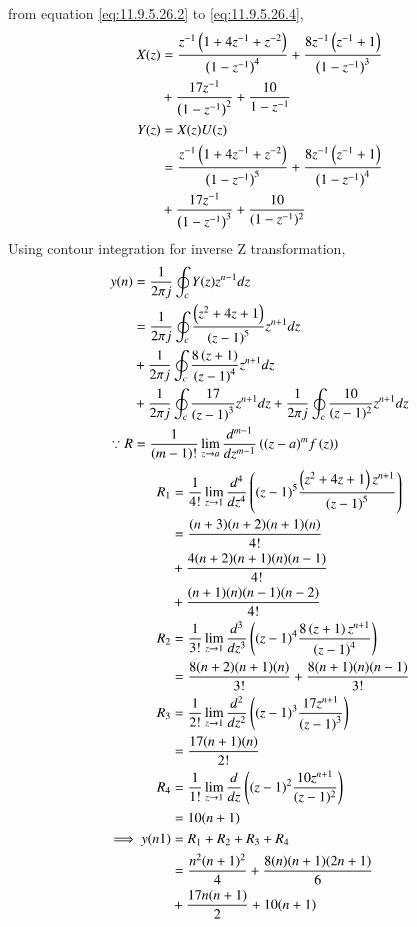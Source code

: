 \documentclass[journal,12pt,twocolumn]{IEEEtran}
\theoremstyle{remark}
\begin{document}
from equation \eqref{eq:11.9.5.26.2} to \eqref{eq:11.9.5.26.4},\\
    \begin{align}
        X(z) &= \frac{z^{-1}\left(1+4z^{-1}+z^{-2}\right)}{\left(1-z^{-1}\right)^4} + \frac{8z^{-1}\left(z^{-1}+1\right)}{\left(1-z^{-1}\right)^3} \nonumber\\
        &+ \frac{17z^{-1}}{\left(1-z^{-1}\right)^2}  + \frac{10}{1-z^{-1}}\\
        Y(z) &= X(z)U(z)\\
        &= \frac{z^{-1}\left(1+4z^{-1}+z^{-2}\right)}{\left(1-z^{-1}\right)^5} + \frac{8z^{-1}\left(z^{-1}+1\right)}{\left(1-z^{-1}\right)^4} \nonumber\\
        &+ \frac{17z^{-1}}{\left(1-z^{-1}\right)^3} +\frac{10}{(1-z^{-1})^2}
    \end{align}
Using contour integration for inverse Z transformation,
    \begin{align}
        y(n) &= \frac{1}{2\pi j}\oint_c Y(z) z^{n-1} dz \\
        &= \frac{1}{2\pi j}\oint_c \frac{\left(z^2+4z+1\right)}{\left(z-1\right)^5} z^{n+1} dz  \nonumber\\
        &+ \frac{1}{2\pi j}\oint_c \frac{8\left(z+1\right)}{\left(z-1\right)^4} z^{n+1} dz   \nonumber\\
        &+ \frac{1}{2\pi j}\oint_c \frac{17}{\left(z-1\right)^3} z^{n+1} dz + \frac{1}{2\pi j}\oint_c \frac{10}{(z-1)^2}z^{n+1} dz\\
        \because R&=\frac{1}{\left(m-1\right)!}\lim\limits_{z\to a}\frac{d^{m-1}}{dz^{m-1}}\left({(z-a)}^{m}f\left(z\right)\right)
    \end{align}
    \begin{align}
        R_1 &=\frac{1}{4!}\lim\limits_{z\to 1}\frac{d^4}{dz^4}\left((z-1)^5 \frac{\left(z^2+4z+1\right)z^{n+1}}{\left(z-1\right)^5}\right)\\
        &= \frac{(n+3)(n+2)(n+1)(n)}{4!} \nonumber\\
        & + \frac{4(n+2)(n+1)(n)(n-1)}{4!} \nonumber\\
        & + \frac{(n+1)(n)(n-1)(n-2)}{4!}\\
        R_2 &=\frac{1}{3!}\lim\limits_{z\to 1}\frac{d^3}{dz^3} \left((z-1)^4 \frac{8\left(z+1\right)z^{n+1}}{\left(z-1\right)^4}\right)\\
        &= \frac{8(n+2)(n+1)(n)}{3!} + \frac{8(n+1)(n)(n-1)}{3!}\\
        R_3 &=\frac{1}{2!}\lim\limits_{z\to 1}\frac{d^2}{dz^2} \left((z-1)^3 \frac{17z^{n+1}}{\left(z-1\right)^3}\right)\\
        &= \frac{17(n+1)(n)}{2!}\\
        R_4 &=\frac{1}{1!}\lim\limits_{z\to 1} \frac{d}{dz} \left((z-1)^2\frac{10z^{n+1}}{(z-1)^2}\right)\\
        &= 10(n+1)\\
        \implies y(n1) &= R_1 + R_2 + R_3 + R_4\\
        &= \frac{n^2(n+1)^2}{4} + \frac{8(n)(n+1)(2n+1)}{6} \nonumber\\
        &+ \frac{17n(n+1)}{2} + 10(n+1)
    \end{align}
\end{document}
